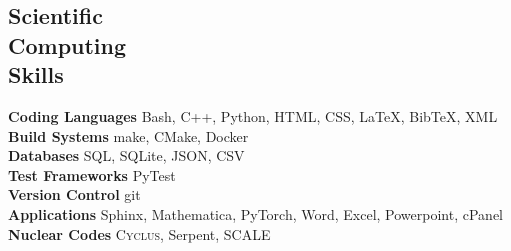 \documentclass[margin,line]{resume}
\newcommand{\cyclus}{\textsc{Cyclus}\xspace}%
\begin{document}
\begin{resume}
    \section{\mysidestyle Scientific\\Computing\\Skills}
        \textbf{Coding Languages} \hfill Bash, C++, Python, HTML, CSS, \LaTeX, BibTeX, XML \vspace{.5mm}\\%
        \textbf{Build Systems} \hfill make, CMake, Docker\vspace{.5mm}\\%
        \textbf{Databases} \hfill SQL, SQLite, JSON, CSV\vspace{.5mm}\\%
        \textbf{Test Frameworks} \hfill PyTest\vspace{.5mm}\\%
        \textbf{Version Control} \hfill git\vspace{.5mm}\\%
        \textbf{Applications} \hfill Sphinx, Mathematica, PyTorch, Word, Excel, Powerpoint, cPanel \\
        \textbf{Nuclear Codes} \hfill \cyclus, Serpent, SCALE\vspace{.5mm}%




\end{resume}
\end{document}
